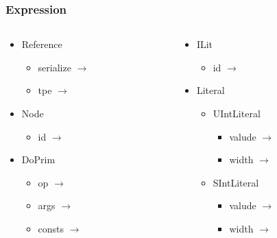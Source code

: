 \begin{frame}
  \frametitle{Expression}

  \begin{columns}
    \begin{column}{0.5\textwidth}
      \begin{itemize}
        \item Reference
          \begin{itemize}
            \item serialize \(\rightarrow\) 
            \item tpe       \(\rightarrow\) 
          \end{itemize}

        \item Node
          \begin{itemize}
            \item id \(\rightarrow\) 
          \end{itemize}

        \item DoPrim
          \begin{itemize}
            \item op     \(\rightarrow\) 
            \item args   \(\rightarrow\) 
            \item consts \(\rightarrow\) 
          \end{itemize}
      \end{itemize}

    \end{column}
    \begin{column}{0.5\textwidth}
      \begin{itemize}
        \item ILit
          \begin{itemize}
            \item id \(\rightarrow\) 
          \end{itemize}

        \item Literal
          \begin{itemize}
            \item {UIntLiteral}
              \begin{itemize}
                \item valude \(\rightarrow\) 
                \item width  \(\rightarrow\) 
              \end{itemize}
            \item{SIntLiteral}
              \begin{itemize}
                \item valude \(\rightarrow\) 
                \item width  \(\rightarrow\) 
              \end{itemize}
          \end{itemize}
      \end{itemize}
    \end{column}
  \end{columns}


\end{frame}
